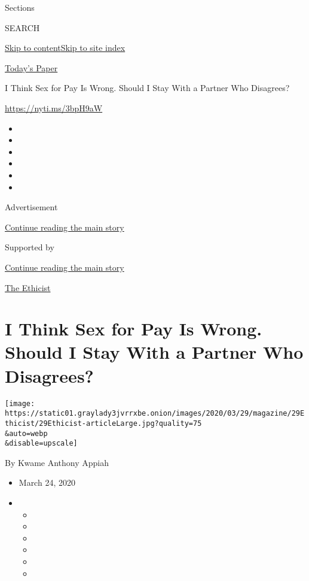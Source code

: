 Sections

SEARCH

\protect\hyperlink{site-content}{Skip to
content}\protect\hyperlink{site-index}{Skip to site index}

\href{https://myaccount.nytimes3xbfgragh.onion/auth/login?response_type=cookie\&client_id=vi}{}

\href{https://www.nytimes3xbfgragh.onion/section/todayspaper}{Today's
Paper}

I Think Sex for Pay Is Wrong. Should I Stay With a Partner Who
Disagrees?

\url{https://nyti.ms/3bpH9aW}

\begin{itemize}
\item
\item
\item
\item
\item
\item
\end{itemize}

Advertisement

\protect\hyperlink{after-top}{Continue reading the main story}

Supported by

\protect\hyperlink{after-sponsor}{Continue reading the main story}

\href{/column/the-ethicist}{The Ethicist}

\hypertarget{i-think-sex-for-pay-is-wrong-should-i-stay-with-a-partner-who-disagrees}{%
\section{I Think Sex for Pay Is Wrong. Should I Stay With a Partner Who
Disagrees?}\label{i-think-sex-for-pay-is-wrong-should-i-stay-with-a-partner-who-disagrees}}

\texttt{[image: https://static01.graylady3jvrrxbe.onion/images/2020/03/29/magazine/29Ethicist/29Ethicist-articleLarge.jpg?quality=75\\\&auto=webp\\\&disable=upscale]}

By Kwame Anthony Appiah

\begin{itemize}
\item
  March 24, 2020
\item
  \begin{itemize}
  \item
  \item
  \item
  \item
  \item
  \item
  \end{itemize}
\end{itemize}

